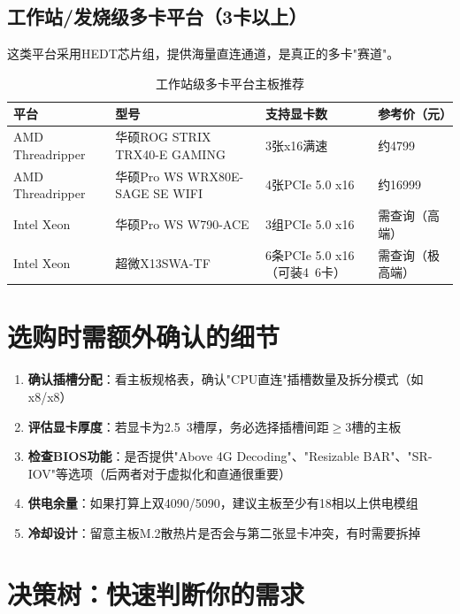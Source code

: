 \documentclass[12pt,UTF8]{ctexbook}
\begin{document}
\subsection{工作站/发烧级多卡平台（3卡以上）}

这类平台采用HEDT芯片组，提供海量直连通道，是真正的多卡"赛道"。

\begin{table}[H]
    \centering
    \begin{tabular}{|p{3cm}|p{4cm}|p{3cm}|p{4cm}|}
        \hline
        \textbf{平台} & \textbf{型号} & \textbf{支持显卡数} & \textbf{参考价（元）} \\
        \hline
        AMD Threadripper & 华硕ROG STRIX TRX40-E GAMING & 3张x16满速 & 约4799 \\
        \hline
        AMD Threadripper & 华硕Pro WS WRX80E-SAGE SE WIFI & 4张PCIe 5.0 x16 & 约16999 \\
        \hline
        Intel Xeon & 华硕Pro WS W790-ACE & 3组PCIe 5.0 x16 & 需查询（高端） \\
        \hline
        Intel Xeon & 超微X13SWA-TF & 6条PCIe 5.0 x16（可装4~6卡） & 需查询（极高端） \\
        \hline
    \end{tabular}
    \caption{工作站级多卡平台主板推荐}
    \label{tab:workstation_multi_gpu}
\end{table}

\section{选购时需额外确认的细节}

\begin{enumerate}
    \item \textbf{确认插槽分配}：看主板规格表，确认"CPU直连"插槽数量及拆分模式（如x8/x8）
    \item \textbf{评估显卡厚度}：若显卡为2.5~3槽厚，务必选择插槽间距$\ge$3槽的主板
    \item \textbf{检查BIOS功能}：是否提供"Above 4G Decoding"、"Resizable BAR"、"SR-IOV"等选项（后两者对于虚拟化和直通很重要）
    \item \textbf{供电余量}：如果打算上双4090/5090，建议主板至少有18相以上供电模组
    \item \textbf{冷却设计}：留意主板M.2散热片是否会与第二张显卡冲突，有时需要拆掉
\end{enumerate}

\section{决策树：快速判断你的需求}
\end{document}
